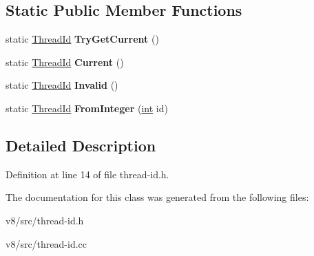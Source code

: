 \subsection*{Static Public Member Functions}
\begin{DoxyCompactItemize}
\item 
\mbox{\label{classv8_1_1internal_1_1ThreadId_a883d163a4ee16acd8900e4bd1acbea05}} 
static \mbox{\hyperlink{classv8_1_1internal_1_1ThreadId}{Thread\+Id}} {\bfseries Try\+Get\+Current} ()
\item 
\mbox{\label{classv8_1_1internal_1_1ThreadId_a81c60d3524b03db2f154b7f682e7796f}} 
static \mbox{\hyperlink{classv8_1_1internal_1_1ThreadId}{Thread\+Id}} {\bfseries Current} ()
\item 
\mbox{\label{classv8_1_1internal_1_1ThreadId_a211793684e9dbeefb1165b8e547a448b}} 
static \mbox{\hyperlink{classv8_1_1internal_1_1ThreadId}{Thread\+Id}} {\bfseries Invalid} ()
\item 
\mbox{\label{classv8_1_1internal_1_1ThreadId_ad4f2604e569a31908f37ebe26657ad60}} 
static \mbox{\hyperlink{classv8_1_1internal_1_1ThreadId}{Thread\+Id}} {\bfseries From\+Integer} (\mbox{\hyperlink{classint}{int}} id)
\end{DoxyCompactItemize}


\subsection{Detailed Description}


Definition at line 14 of file thread-\/id.\+h.



The documentation for this class was generated from the following files\+:\begin{DoxyCompactItemize}
\item 
v8/src/thread-\/id.\+h\item 
v8/src/thread-\/id.\+cc\end{DoxyCompactItemize}
